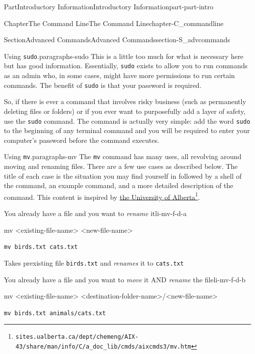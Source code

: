 \documentclass[oneside,10pt,]{book}
\newcommand{\mono}[1]{\texttt{#1}}
\begin{document}
\begin{partptx}{Part}{Introductory Information}{}{Introductory Information}{}{}{part-part-intro}
\begin{chapterptx}{Chapter}{The Command Line}{}{The Command Line}{}{}{chapter-C_commandline}
\begin{sectionptx}{Section}{Advanced Commands}{}{Advanced Commands}{}{}{section-S_advcommands}
\begin{paragraphs}{Using \mono{sudo}.}{paragraphs-sudo}
This is a little too much for what is necessary here but has good information. Essentially, \mono{sudo} exists to allow you to run commands as an admin who, in some cases, might have more permissions to run certain commands. The benefit of \mono{sudo} is that your password is required.%
\par
So, if there is ever a command that involves risky business (such as permanently deleting files or folders) or if you ever want to purposefully add a layer of safety, use the \mono{sudo} command. The command is actually very simple: add the word \mono{sudo} to the beginning of any terminal command and you will be required to enter your computer's password before the command executes.%
\end{paragraphs}%
\begin{paragraphs}{Using \mono{mv}.}{paragraphs-mv}%
%
%
%
%
The \mono{mv} command has many uses, all revolving around moving and renaming files. There are a few use cases as described below. The title of each case is the situation you may find yourself in followed by a shell of the command, an example command, and a more detailed description of the command. This content is inspired by \href{https://sites.ualberta.ca/dept/chemeng/AIX-43/share/man/info/C/a_doc_lib/cmds/aixcmds3/mv.htm}{the University of Alberta}\footnote{\nolinkurl{sites.ualberta.ca/dept/chemeng/AIX-43/share/man/info/C/a_doc_lib/cmds/aixcmds3/mv.htm}\label{fn-mv-f-c}}.%
\begin{descriptionlist}
\begin{dlinarrow}{You already have a file and you want to \emph{rename} it}{li-mv-f-d-a}%
%
\begin{codedisplay}
mv <existing-file-name> <new-file-name>
\end{codedisplay}
%
\par
\mono{mv birds.txt cats.txt}%
\par
Takes prexisting file \mono{birds.txt} and \emph{renames} it to \mono{cats.txt}%
\end{dlinarrow}%
\begin{dlinarrow}{You already have a file and you want to \emph{move} it AND \emph{rename} the file}{li-mv-f-d-b}%
%
\begin{codedisplay}
mv <existing-file-name>
	<destination-folder-name>/<new-file-name>
\end{codedisplay}
%
\par
\mono{mv birds.txt animals/cats.txt}%
\par

\end{dlinarrow}
\end{descriptionlist}
\end{paragraphs}
\end{sectionptx}
\end{chapterptx}
\end{partptx}
\end{document}
